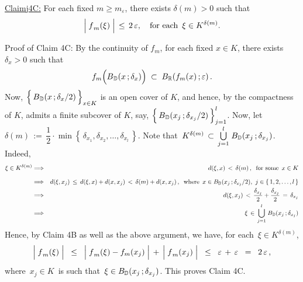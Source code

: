 \vskip 0.8cm
\begin{center}\begin{minipage}{6.5in}
\underline{Claim{{\color{white}j}}4C:}\;\;
For each fixed $m \geq m_{\varepsilon}$, there exists $\delta(m) > 0$ such that
\begin{equation*}
\left\vert\;\overset{{\color{white}.}}{f}_{m}(\xi)\;\right\vert \,\leq\,  2\,\varepsilon,
\quad
\textnormal{for each \,$\xi \in K^{\delta(m)}$}.
\end{equation*}
\end{minipage}\end{center}
Proof of Claim 4C:\;\;
By the continuity of $f_{m}$, for each fixed $x \in K$, there exists
$\delta_{x} > 0$ such that
\begin{equation*}
f_{m}\!\left(\overset{{\color{white}.}}{B}_{\D}(x\,;\delta_{x})\right)
\; \subset \;
	B_{\Re}\!\left(f_{m}(x)\,;\varepsilon\right).
\end{equation*}
Now, $\left\{\, \overset{{\color{white}.}}{B}_{\D}(x\,;\delta_{x}/2) \,\right\}_{x \in K}$
is an open cover of $K$, and hence, by the compactness of $K$, admits a finite
subcover of $K$, say,
$\left\{\, \overset{{\color{white}.}}{B}_{\D}(x_{j}\,;\delta_{x_{j}}/2) \,\right\}_{j = 1}^{l}$.
Now, let
\,$\delta(m) \,:=\, \dfrac{1}{2}\cdot\min\!\left\{\,\delta_{x_{1}},\delta_{x_{2}},\ldots,\delta_{x_{l}}\,\right\}$.
Note that
\,$K^{\delta(m)} \,\subset\, \overset{l}{\underset{j=1}{\bigcup}} \; B_{\mathbb{D}}(x_{j}\,;\delta_{x_{j}})$.
Indeed,
\begin{eqnarray*}
\xi \in K^{\delta(m)}
&\Longrightarrow&
	d(\xi,x) \,<\, \delta(m)\,, \;\;\textnormal{for some \,$x \in K$}
\\
&\overset{{\color{white}\overset{.}{1}}}{\Longrightarrow}&
	d(\xi,x_{j}) \,\leq\, d(\xi,x) + d(x,x_{j}) \,<\, \delta(m) + d(x,x_{j})\,,
	\;\;\textnormal{where \,$x \in B_{\D}(x_{j}\,;\delta_{x_{j}}/2)$, \,$j\in\{\,1,2,\ldots,l\,\}$}
\\
&\Longrightarrow&
	d(\xi,x_{j}) \,<\, \dfrac{\delta_{x_{j}}}{2} + \dfrac{\delta_{x_{j}}}{2} \,=\, \delta_{x_{j}}
\\
&\Longrightarrow&
	\xi \,\in\, \overset{l}{\underset{j=1}{\bigcup}} \; B_{\D}(x_{j}\,;\delta_{x_{j}})
\end{eqnarray*}
Hence, by Claim 4B as well as the above argument, we have, for each \,$\xi \in K^{\delta(m)}$,
\begin{equation*}
\left\vert\;\overset{{\color{white}.}}{f}_{m}(\xi)\;\right\vert
\;\; \leq \;\;
	\left\vert\;\overset{{\color{white}.}}{f}_{m}(\xi) - f_{m}(x_{j})\;\right\vert
	\,+\,
	\left\vert\;\overset{{\color{white}.}}{f}_{m}(x_{j})\;\right\vert
\;\; \leq \;\;
	\varepsilon \,+\, \varepsilon 
\;\; = \;\;
	2\,\varepsilon\,,
\end{equation*}
where \,$x_{j} \in K$\, is such that \,$\xi \in B_{\mathbb{D}}(x_{j}\,;\delta_{x_{j}})$.
This proves Claim 4C.

